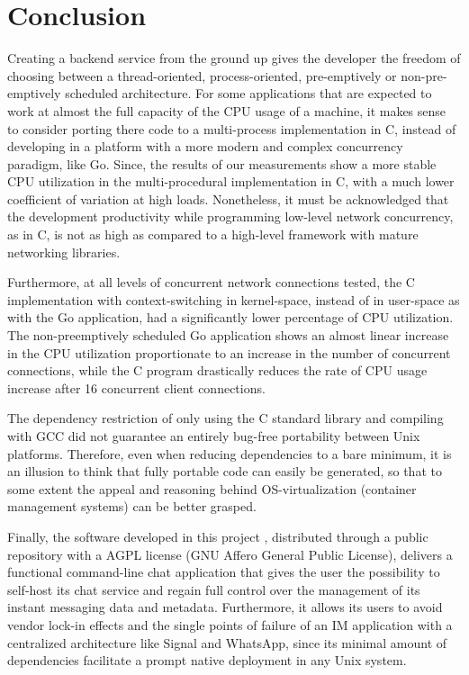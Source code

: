 \section{Conclusion}
Creating a backend service from the ground up gives the developer the freedom of choosing between a thread-oriented, process-oriented, pre-emptively or non-pre-emptively scheduled architecture. For some applications that are expected to work at almost the full capacity of the CPU usage of a machine, it makes sense to consider porting there code to a multi-process implementation in C, instead of developing in a platform with a more modern and complex concurrency paradigm, like Go. Since, the results of our measurements show a more stable CPU utilization in the multi-procedural implementation in C, with a much lower coefficient of variation at high loads.  Nonetheless, it must be acknowledged that the development productivity while programming low-level network concurrency, as in C, is not as high as compared to a high-level framework with mature networking libraries.

Furthermore, at all levels of concurrent network connections tested, the C implementation with context-switching in kernel-space, instead of in user-space as with the Go application, had a significantly lower percentage of CPU utilization. The non-preemptively scheduled Go application shows an almost linear increase in the CPU utilization proportionate to an increase in the number of concurrent connections, while the C program drastically reduces the rate of CPU usage increase after 16 concurrent client connections. 

The dependency restriction of only using the C standard library and compiling with GCC did not guarantee an entirely bug-free portability between Unix platforms. Therefore, even when reducing dependencies to a bare minimum, it is an illusion to think that fully portable code can easily be generated, so that to some extent the appeal and reasoning behind OS-virtualization (container management systems) can be better grasped.

Finally, the software developed in this project \cite{Rodriguez2022}, distributed through a public repository with a AGPL license (GNU Affero General Public License), delivers a functional command-line chat application that gives the user the possibility to self-host its chat service and regain full control over the management of its instant messaging data and metadata. Furthermore, it allows its users to avoid vendor lock-in effects and the single points of failure of an IM application with a centralized architecture like Signal and WhatsApp, since its minimal amount of dependencies facilitate a prompt native deployment in any Unix system.